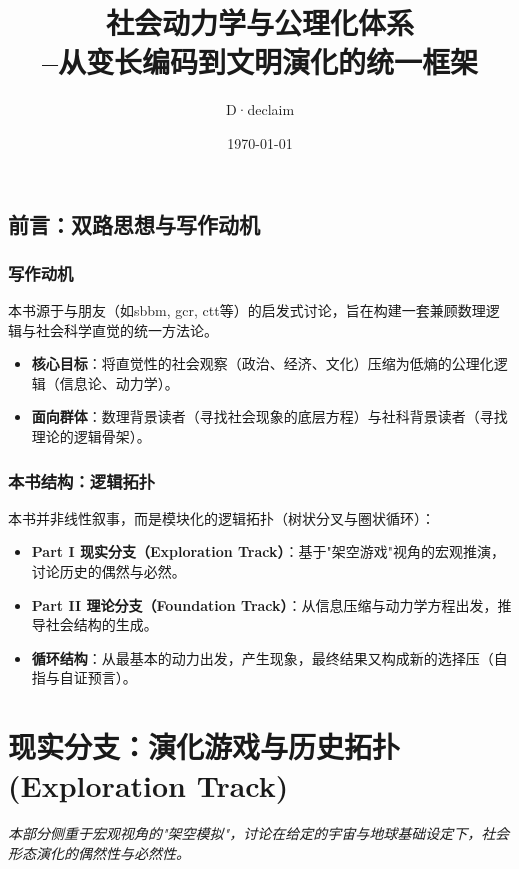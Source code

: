 \documentclass[openany]{book} %
\title{\textbf{社会动力学与公理化体系}\\ \large --从变长编码到文明演化的统一框架}
\author{D·declaim}
\date{\today}
\begin{document}
	\maketitle

	\chapter*{前言：双路思想与写作动机}

	\section*{写作动机}
	本书源于与朋友（如sbbm, gcr, ctt等）的启发式讨论，旨在构建一套兼顾数理逻辑与社会科学直觉的统一方法论。
	\begin{itemize}
		\item \textbf{核心目标}：将直觉性的社会观察（政治、经济、文化）压缩为低熵的公理化逻辑（信息论、动力学）。
		\item \textbf{面向群体}：数理背景读者（寻找社会现象的底层方程）与社科背景读者（寻找理论的逻辑骨架）。
	\end{itemize}

	\section*{本书结构：逻辑拓扑}
	本书并非线性叙事，而是模块化的逻辑拓扑（树状分叉与圈状循环）：
	\begin{itemize}
		\item \textbf{Part I 现实分支（Exploration Track）}：基于"架空游戏"视角的宏观推演，讨论历史的偶然与必然。
		\item \textbf{Part II 理论分支（Foundation Track）}：从信息压缩与动力学方程出发，推导社会结构的生成。
		\item \textbf{循环结构}：从最基本的动力出发，产生现象，最终结果又构成新的选择压（自指与自证预言）。
	\end{itemize}

	\tableofcontents
	\mainmatter

	\part{现实分支：演化游戏与历史拓扑 (Exploration Track)}
	\vspace{2em}
	\textit{本部分侧重于宏观视角的"架空模拟"，讨论在给定的宇宙与地球基础设定下，社会形态演化的偶然性与必然性。}
\end{document}
